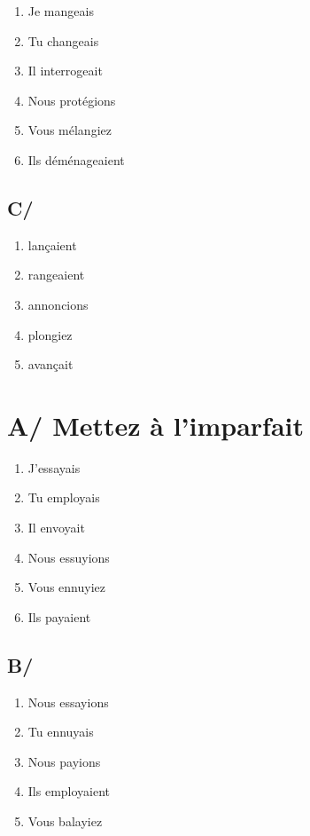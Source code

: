 \begin{enumerate}
    \item Je mangeais
    \item Tu changeais
    \item Il interrogeait
    \item Nous protégions
    \item Vous mélangiez
    \item Ils déménageaient
\end{enumerate}

\subsection{C/}

\begin{enumerate}
    \item lançaient
    \item rangeaient
    \item annoncions
    \item plongiez
    \item avançait
\end{enumerate}

\section{A/ Mettez à l'imparfait}

\begin{enumerate}
    \item J'essayais
    \item Tu employais
    \item Il envoyait
    \item Nous essuyions
    \item Vous ennuyiez
    \item Ils payaient
\end{enumerate}

\subsection{B/}

\begin{enumerate}
    \item Nous essayions
    \item Tu ennuyais
    \item Nous payions
    \item Ils employaient
    \item Vous balayiez
\end{enumerate}

